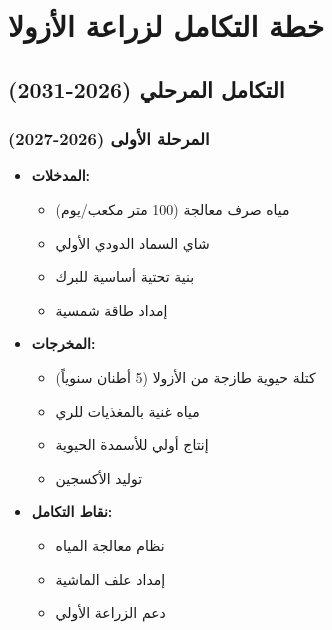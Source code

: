 \section{خطة التكامل لزراعة الأزولا}

\subsection{التكامل المرحلي (2026-2031)}

\subsubsection{المرحلة الأولى (2026-2027)}
\begin{itemize}
    \item \textbf{المدخلات:}
    \begin{itemize}
        \item مياه صرف معالجة (100 متر مكعب/يوم)
        \item شاي السماد الدودي الأولي
        \item بنية تحتية أساسية للبرك
        \item إمداد طاقة شمسية
    \end{itemize}
    \item \textbf{المخرجات:}
    \begin{itemize}
        \item كتلة حيوية طازجة من الأزولا (5 أطنان سنوياً)
        \item مياه غنية بالمغذيات للري
        \item إنتاج أولي للأسمدة الحيوية
        \item توليد الأكسجين
    \end{itemize}
    \item \textbf{نقاط التكامل:}
    \begin{itemize}
        \item نظام معالجة المياه
        \item إمداد علف الماشية
        \item دعم الزراعة الأولي
    \end{itemize}
\end{itemize}

